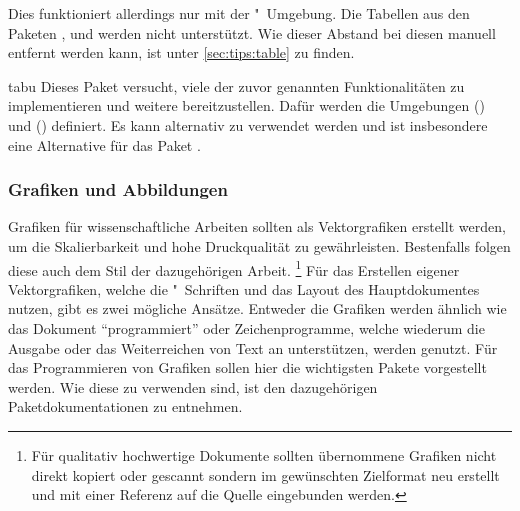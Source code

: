 \begin{packages}
  Dies funktioniert allerdings nur mit der "~Umgebung. 
  Die Tabellen aus den Paketen ,  und 
   werden nicht unterstützt. Wie dieser Abstand bei diesen 
  manuell entfernt werden kann, ist unter \autoref{sec:tips:table} zu finden.
\item[tabu]
  Dieses Paket versucht, viele der zuvor genannten Funktionalitäten zu 
  implementieren und weitere bereitzustellen. Dafür werden die Umgebungen 
  () und () 
  definiert. Es kann alternativ zu  verwendet werden und ist 
  insbesondere eine Alternative für das Paket .
  
\end{packages}
%



\subsubsection{%
  Grafiken und Abbildungen%
}
Grafiken für wissenschaftliche Arbeiten sollten als Vektorgrafiken erstellt 
werden, um die Skalierbarkeit und hohe Druckqualität zu gewährleisten. 
Bestenfalls folgen diese auch dem Stil der dazugehörigen Arbeit.%
\footnote{%
  Für qualitativ hochwertige Dokumente sollten übernommene Grafiken nicht 
  direkt kopiert oder gescannt sondern im gewünschten Zielformat neu erstellt 
  und mit einer Referenz auf die Quelle eingebunden werden.%
}
Für das Erstellen eigener Vektorgrafiken, welche die "~Schriften 
und das Layout des Hauptdokumentes nutzen, gibt es zwei mögliche Ansätze. 
Entweder die Grafiken werden ähnlich wie das Dokument \enquote{programmiert} 
oder Zeichenprogramme, welche wiederum die Ausgabe oder das Weiterreichen von 
Text an  unterstützen, werden genutzt. Für das Programmieren von 
Grafiken sollen hier die wichtigsten Pakete vorgestellt werden. Wie diese zu 
verwenden sind, ist den dazugehörigen Paketdokumentationen zu entnehmen. 

